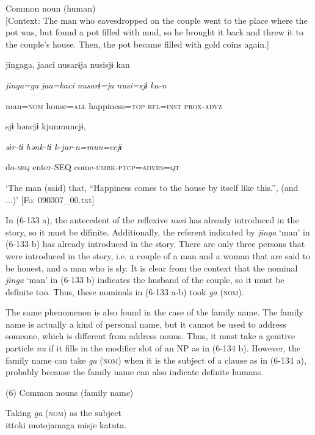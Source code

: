  \ex Common noun (human)\\{}
[Context: The man who eavesdropped on the couple went to the place where the pot was, but found a pot filled with mud, so he brought it back and threw it to the couple’s house. Then, the pot became filled with gold coins again.]

{\TM}
\gll jingaga,  jaaci  nusarɨja  nusisjɨ  kan

      \textit{jinga=ga}  \textit{jaa=kaci}  \textit{nusarɨ=ja}  \textit{nusi=sjɨ}  \textit{ka-n}

      man=\textsc{nom}  house=\textsc{all}  happiness=\textsc{top}  \textsc{rfl}=\textsc{inst}  \textsc{prox}-\textsc{advz}

      sjɨ  həncjɨ  kjunmuncjɨ,

      \textit{sɨr-tɨ}  \textit{hənk-tɨ}  \textit{k-jur-n=mun=ccjɨ}

      do-\textsc{seq}  enter-SEQ  come-\textsc{umrk}-\textsc{ptcp}=\textsc{advrs}=\textsc{qt}

\glt ‘The man (said) that, “Happiness comes to the house by itself like this.”, (and ...)’ [Fo: 090307\_00.txt]
\z

In (6-133 a), the antecedent of the reflexive \textit{nusi} has already introduced in the story, so it must be difinite. Additionally, the referent indicated by \textit{jinga} ‘man’ in (6-133 b) has already introduced in the story. There are only three persons that were introduced in the story, i.e. a couple of a man and a woman that are said to be honest, and a man who is sly. It is clear from the context that the nominal \textit{jinga} ‘man’ in (6-133 b) indicates the husband of the couple, so it must be definite too. Thus, these nominals in (6-133 a-b) took \textit{ga} (\textsc{nom}).

The same phenomenon is also found in the case of the family name. The family name is actually a kind of personal name, but it cannot be used to address someone, which is different from address nouns. Thus, it must take a genitive particle \textit{nu} if it fills in the modifier slot of an NP as in (6-134 b). However, the family name can take \textit{ga} (\textsc{nom}) when it is the subject of a clause as in (6-134 a), probably because the family name can also indicate definite humans.

(6)  Common nouns (family name)

 \ea Taking \textit{ga} (\textsc{nom}) as the subject\\
{\TM}
\gll  {\textbar}ittoki{\textbar}  motojamaga  misje  katuta.\\

